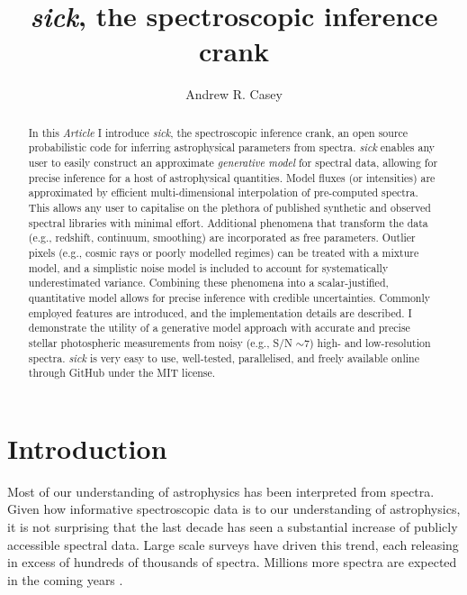 \documentclass{aastex}
\newcommand{\sick}{\textit{sick}}
\newcommand{\article}{\textit{Article}}
\begin{document}
\title{\sick, the spectroscopic inference crank}

\author{Andrew R. Casey}


\begin{abstract}
In this \article{}  I  introduce \sick{}, the spectroscopic inference crank, an open source probabilistic code for inferring astrophysical parameters from spectra. \sick{} enables any user to easily construct an approximate \textit{generative model} for spectral data, allowing for precise inference for a host of astrophysical quantities. Model fluxes (or intensities) are approximated by efficient multi-dimensional interpolation of pre-computed spectra. This allows any user to capitalise on the plethora of published synthetic and observed spectral libraries with minimal effort. Additional phenomena that transform the data (e.g., redshift, continuum, smoothing) are incorporated as free parameters. Outlier pixels (e.g., cosmic rays or poorly modelled regimes) can be treated with a mixture model, and a simplistic noise model is included to account for systematically underestimated variance. Combining these phenomena into a scalar-justified, quantitative model allows for precise inference with credible uncertainties. Commonly employed features are introduced, and the implementation details are described. I demonstrate the utility of a generative model approach with accurate and precise stellar photospheric measurements from noisy (e.g., S/N $\sim{} 7$) high- and low-resolution spectra. \sick{} is very easy to use, well-tested, parallelised, and freely available online through GitHub under the MIT license. 
\end{abstract}

\section{Introduction}
Most of our understanding of astrophysics has been interpreted from spectra. Given how informative spectroscopic data is to our understanding of astrophysics, it is not surprising that the last decade has seen a substantial increase of publicly accessible spectral data. Large scale surveys have driven this trend, each releasing in excess of hundreds of thousands \citep[e.g.,][]{wigglez,boss,segue,rave,gaia-eso} of spectra. Millions more spectra are expected in the coming years \citep[e.g.,][]{lamost,galah}.
 
\end{document}
